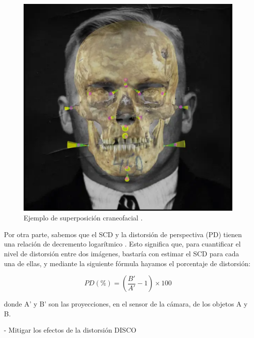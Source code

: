 \begin{figure}[h]
	\centering
	\includegraphics[scale=0.25]{imagenes/cap1/skull_superimposition.png}
	\caption{Ejemplo de superposición craneofacial \cite{23}.}
	\label{fig2}
\end{figure}


Por otra parte, sabemos que el SCD y la distorsión de perspectiva (PD) tienen una relación de decremento logarítmico \cite{13}. Esto significa que, para cuantificar el nivel de distorsión entre dos imágenes, bastaría con estimar el SCD para cada una de ellas, y mediante la siguiente fórmula hayamos el porcentaje de distorsión:

$$PD(\%) = (\frac{B'}{A'} - 1) \times 100$$

donde A' y B' son las proyecciones, en el sensor de la cámara, de los objetos A y B.

- Mitigar los efectos de la distorsión  DISCO


